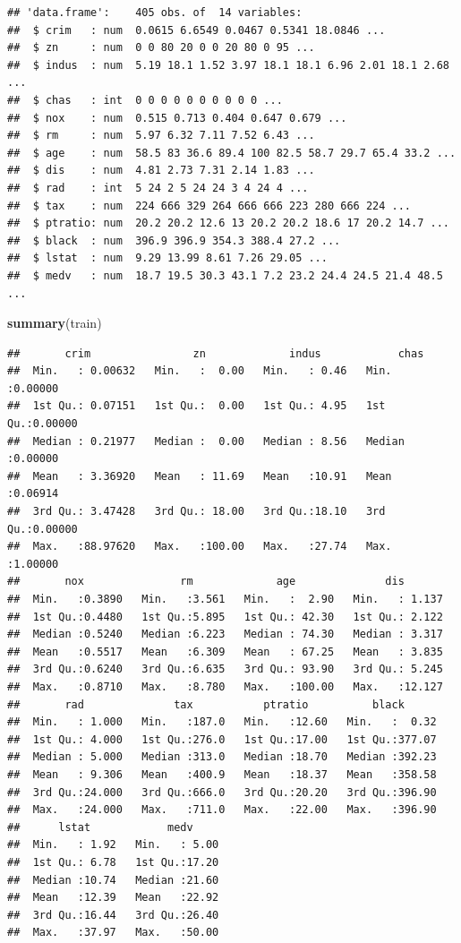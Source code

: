 \documentclass[
]{book}
\newenvironment{Shaded}{\begin{snugshade}}{\end{snugshade}}
\newcommand{\FunctionTok}[1]{\textcolor[rgb]{0.13,0.29,0.53}{\textbf{#1}}}
\newcommand{\NormalTok}[1]{#1}
\theoremstyle{break}
\theoremstyle{nonumberplain}
\begin{document}
\begin{verbatim}
## 'data.frame':    405 obs. of  14 variables:
##  $ crim   : num  0.0615 6.6549 0.0467 0.5341 18.0846 ...
##  $ zn     : num  0 0 80 20 0 0 20 80 0 95 ...
##  $ indus  : num  5.19 18.1 1.52 3.97 18.1 18.1 6.96 2.01 18.1 2.68 ...
##  $ chas   : int  0 0 0 0 0 0 0 0 0 0 ...
##  $ nox    : num  0.515 0.713 0.404 0.647 0.679 ...
##  $ rm     : num  5.97 6.32 7.11 7.52 6.43 ...
##  $ age    : num  58.5 83 36.6 89.4 100 82.5 58.7 29.7 65.4 33.2 ...
##  $ dis    : num  4.81 2.73 7.31 2.14 1.83 ...
##  $ rad    : int  5 24 2 5 24 24 3 4 24 4 ...
##  $ tax    : num  224 666 329 264 666 666 223 280 666 224 ...
##  $ ptratio: num  20.2 20.2 12.6 13 20.2 20.2 18.6 17 20.2 14.7 ...
##  $ black  : num  396.9 396.9 354.3 388.4 27.2 ...
##  $ lstat  : num  9.29 13.99 8.61 7.26 29.05 ...
##  $ medv   : num  18.7 19.5 30.3 43.1 7.2 23.2 24.4 24.5 21.4 48.5 ...
\end{verbatim}

\begin{Shaded}
\begin{Highlighting}[]
\FunctionTok{summary}\NormalTok{(train)}
\end{Highlighting}
\end{Shaded}

\begin{verbatim}
##       crim                zn             indus            chas        
##  Min.   : 0.00632   Min.   :  0.00   Min.   : 0.46   Min.   :0.00000  
##  1st Qu.: 0.07151   1st Qu.:  0.00   1st Qu.: 4.95   1st Qu.:0.00000  
##  Median : 0.21977   Median :  0.00   Median : 8.56   Median :0.00000  
##  Mean   : 3.36920   Mean   : 11.69   Mean   :10.91   Mean   :0.06914  
##  3rd Qu.: 3.47428   3rd Qu.: 18.00   3rd Qu.:18.10   3rd Qu.:0.00000  
##  Max.   :88.97620   Max.   :100.00   Max.   :27.74   Max.   :1.00000  
##       nox               rm             age              dis        
##  Min.   :0.3890   Min.   :3.561   Min.   :  2.90   Min.   : 1.137  
##  1st Qu.:0.4480   1st Qu.:5.895   1st Qu.: 42.30   1st Qu.: 2.122  
##  Median :0.5240   Median :6.223   Median : 74.30   Median : 3.317  
##  Mean   :0.5517   Mean   :6.309   Mean   : 67.25   Mean   : 3.835  
##  3rd Qu.:0.6240   3rd Qu.:6.635   3rd Qu.: 93.90   3rd Qu.: 5.245  
##  Max.   :0.8710   Max.   :8.780   Max.   :100.00   Max.   :12.127  
##       rad              tax           ptratio          black       
##  Min.   : 1.000   Min.   :187.0   Min.   :12.60   Min.   :  0.32  
##  1st Qu.: 4.000   1st Qu.:276.0   1st Qu.:17.00   1st Qu.:377.07  
##  Median : 5.000   Median :313.0   Median :18.70   Median :392.23  
##  Mean   : 9.306   Mean   :400.9   Mean   :18.37   Mean   :358.58  
##  3rd Qu.:24.000   3rd Qu.:666.0   3rd Qu.:20.20   3rd Qu.:396.90  
##  Max.   :24.000   Max.   :711.0   Max.   :22.00   Max.   :396.90  
##      lstat            medv      
##  Min.   : 1.92   Min.   : 5.00  
##  1st Qu.: 6.78   1st Qu.:17.20  
##  Median :10.74   Median :21.60  
##  Mean   :12.39   Mean   :22.92  
##  3rd Qu.:16.44   3rd Qu.:26.40  
##  Max.   :37.97   Max.   :50.00
\end{verbatim}
\end{document}
